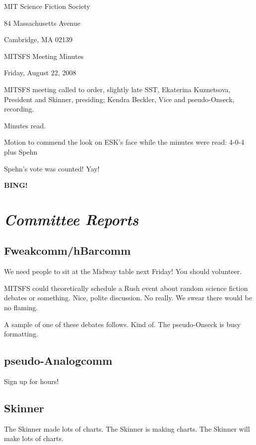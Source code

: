 \documentclass[10pt]{article}
\newcommand{\bing}{{\bf BING!} }
\newcommand{\goto}[1]{\bing \vskip 12pt \section*{{\em{#1}}}}
\newcommand{\ps}{ plus Spehn\xspace}
\begin{document}
\begin{center}

MIT Science Fiction Society

84 Massachusetts Avenue

Cambridge, MA 02139

\vspace{12pt}

MITSFS Meeting Minutes

Friday, August 22, 2008

\end{center}

\vspace{18pt}

\setlength{\parskip}{6pt}

\noindent
MITSFS meeting called to order, slightly late SST,
Ekaterina Kuznetsova, President and Skinner, presiding; Kendra Beckler, Vice and pseudo-Onseck, recording.

Minutes read.

Motion to commend the look on ESK's face while the minutes were read: 4-0-4 \ps

Spehn's vote was counted!  Yay!

\BING

\goto{Committee Reports}

\subsection*{Fweakcomm/hBarcomm}
We need people to sit at the Midway table next Friday!  You should volunteer.

MITSFS could theoretically schedule a Rush event about random science fiction debates or something.  Nice, polite discussion.  No really.  We swear there would be no flaming.

A sample of one of these debates follows.  Kind of.  The pseudo-Onseck is busy formatting.

\subsection*{pseudo-Analogcomm}

Sign up for hours!

\subsection*{Skinner}

The Skinner made lots of charts.  The Skinner is making charts.  The Skinner will make lots of charts.
\end{document}
